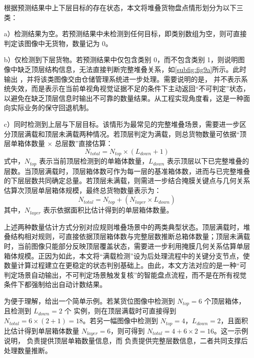 根据预测结果中上下层目标的存在状态，本文将堆叠货物盘点情形划分为以下三类：

a）检测结果为空。若预测结果中未检测到任何目标，即类别数组为空，则可直接判定该图像中无货物，数量记为 0。

b）仅检测到下层货物。若预测结果中仅包含类别 0，而不包含类别 1，则说明图像中缺乏顶层结构信息，无法直接判断完整堆叠关系，如\autoref{subfig:fig9a}所示。此时输出 ，并将该类图像交由仓储管理系统进一步处理。需要说明的是， 并不表示系统失效，而是表示在当前单视角视觉证据不足的条件下主动返回“不可判定”状态，以避免在缺乏顶层信息时输出不可靠的数量结果。从工程实现角度看，这是一种面向实际业务的保守回退机制。

c）同时检测到上层与下层目标。该情形为最常见的完整堆叠场景，需要进一步区分顶层满载和顶层未满载两种情况。若顶层判定为满载，则总货物数量可依据“顶层单箱体数量 $\times$ 总层数”直接估算：
\begin{equation}\label{eq:total-full}
{N_{\mathit{total}}} = {N_{\mathit{top}}} \times ({L_{\mathit{down}}} + 1)
\end{equation}
式中，$N_{\mathit{top}}$ 表示当前顶层检测到的单箱体数量，$L_{\mathit{down}}$ 表示顶层以下已完整堆叠的层数。当顶层满载时，顶层箱体数可作为每一层的基准箱体数，进而与已完整堆叠的下层层数共同确定总量。若顶层未满载，则需进一步结合掩膜关键点与几何关系估算次顶层单层箱体规模，最终总货物数量表示为：
\begin{equation}\label{eq:total-unfull}
{N_{\mathit{total}}} = {N_{\mathit{top}}} + ({N_{\mathit{layer}}} \times {L_{\mathit{down}}})
\end{equation}
其中，$N_{\mathit{layer}}$ 表示依据面积比估计得到的单层箱体数量。

上述两种数量估计方式分别对应规则堆叠场景中的两类典型状态。顶层满载时，堆叠结构相对规则，可直接依据顶层箱体数与完整层数推断总箱体数量；顶层未满载时，当前图像只能部分反映顶层覆盖状态，需要进一步利用掩膜几何关系估算单层箱体规模。正因为如此，本文将“满载检测”设为后处理流程中的关键分支节点，使数量计算过程建立在更稳定的状态判别基础上。由此，本文方法对应的是一种“可判定场景自动输出，不可判定场景触发复核”的智能盘点流程，而不是在所有视觉条件下都强制给出自动计数结果。

为便于理解，给出一个简单示例。若某货位图像中检测到 $N_{\mathit{top}}=6$ 个顶层箱体，且检测到 $L_{\mathit{down}}=2$ 个  实例，则在顶层满载时可直接得到 $N_{\mathit{total}}=6\times(2+1)=18$。若另一幅图像中检测到 $N_{\mathit{top}}=4$，$L_{\mathit{down}}=2$，且面积比估计得到单层箱体数量 $N_{\mathit{layer}}=6$，则可得到 $N_{\mathit{total}}=4+6\times2=16$。这一示例说明， 负责提供顶层单箱数量信息，而  负责提供完整层数信息，二者共同支撑后处理数量推断。

